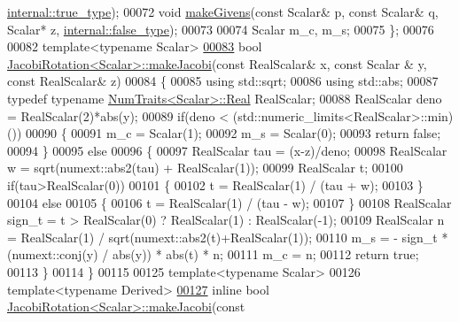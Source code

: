 \begin{DoxyCode}
      \hyperlink{struct_eigen_1_1internal_1_1true__type}{internal::true\_type});
00072     \textcolor{keywordtype}{void} \hyperlink{group___jacobi___module_af73c81e9cc139b7e0d877ce553b02ec0}{makeGivens}(\textcolor{keyword}{const} Scalar& p, \textcolor{keyword}{const} Scalar& q, Scalar* z, 
      \hyperlink{struct_eigen_1_1internal_1_1false__type}{internal::false\_type});
00073 
00074     Scalar m\_c, m\_s;
00075 \};
00076 
00082 \textcolor{keyword}{template}<\textcolor{keyword}{typename} Scalar>
\hyperlink{group___jacobi___module_a6572f272cac38e070a99b466dd1fbc74}{00083} \textcolor{keywordtype}{bool} \hyperlink{group___jacobi___module_a69076401f22e883dc76b6ff9074ac669}{JacobiRotation<Scalar>::makeJacobi}(\textcolor{keyword}{const} RealScalar& x, \textcolor{keyword}{const} Scalar
      & y, \textcolor{keyword}{const} RealScalar& z)
00084 \{
00085   \textcolor{keyword}{using} std::sqrt;
00086   \textcolor{keyword}{using} std::abs;
00087   \textcolor{keyword}{typedef} \textcolor{keyword}{typename} \hyperlink{group___core___module_struct_eigen_1_1_num_traits}{NumTraits<Scalar>::Real} RealScalar;
00088   RealScalar deno = RealScalar(2)*abs(y);
00089   \textcolor{keywordflow}{if}(deno < (std::numeric\_limits<RealScalar>::min)())
00090   \{
00091     m\_c = Scalar(1);
00092     m\_s = Scalar(0);
00093     \textcolor{keywordflow}{return} \textcolor{keyword}{false};
00094   \}
00095   \textcolor{keywordflow}{else}
00096   \{
00097     RealScalar tau = (x-z)/deno;
00098     RealScalar w = sqrt(numext::abs2(tau) + RealScalar(1));
00099     RealScalar t;
00100     \textcolor{keywordflow}{if}(tau>RealScalar(0))
00101     \{
00102       t = RealScalar(1) / (tau + w);
00103     \}
00104     \textcolor{keywordflow}{else}
00105     \{
00106       t = RealScalar(1) / (tau - w);
00107     \}
00108     RealScalar sign\_t = t > RealScalar(0) ? RealScalar(1) : RealScalar(-1);
00109     RealScalar n = RealScalar(1) / sqrt(numext::abs2(t)+RealScalar(1));
00110     m\_s = - sign\_t * (numext::conj(y) / abs(y)) * abs(t) * n;
00111     m\_c = n;
00112     \textcolor{keywordflow}{return} \textcolor{keyword}{true};
00113   \}
00114 \}
00115 
00125 \textcolor{keyword}{template}<\textcolor{keyword}{typename} Scalar>
00126 \textcolor{keyword}{template}<\textcolor{keyword}{typename} Derived>
\hyperlink{group___jacobi___module_a69076401f22e883dc76b6ff9074ac669}{00127} \textcolor{keyword}{inline} \textcolor{keywordtype}{bool} \hyperlink{group___jacobi___module_a69076401f22e883dc76b6ff9074ac669}{JacobiRotation<Scalar>::makeJacobi}(\textcolor{keyword}{const} 

\end{DoxyCode}
